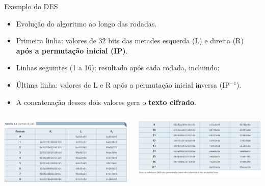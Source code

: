 \begin{frame}{Exemplo do DES}

    \begin{itemize}
        \item Evolução do algoritmo ao longo das rodadas.
        \item Primeira linha: valores de 32 bits das metades esquerda (L) e direita (R) \textbf{após a permutação inicial (IP)}.
        \item Linhas seguintes (1 a 16): resultado após cada rodada, incluindo:

        \item Última linha: valores de L e R após a permutação inicial inversa (IP$^{-1}$).
        \item A concatenação desses dois valores gera o \textbf{texto cifrado}.
    \end{itemize}
    \begin{columns}
        \begin{column}{0.48\textwidth}
            \centering
            \includegraphics[width=\linewidth]{Figuras/des-lado1.png}

        \end{column}
        \begin{column}{0.48\textwidth}
            \centering
            \includegraphics[width=\linewidth]{Figuras/des-lado2.png}

        \end{column}
    \end{columns}
\end{frame}

